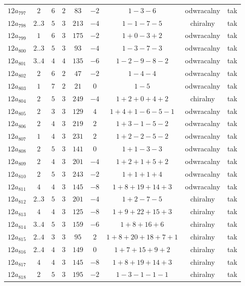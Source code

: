 \begin{longtable}{ccccccccc}
$12a_{797}$ & $2$ & $6$ & $2$ & $83$ & $-2$ & $1-3-6$ & odwracalny & tak \\
$12a_{798}$ & $2..3$ & $5$ & $3$ & $213$ & $-4$ & $1-1-7-5$ & chiralny & tak \\
$12a_{799}$ & $1$ & $6$ & $3$ & $175$ & $-2$ & $1+0-3+2$ & odwracalny & tak \\
$12a_{800}$ & $2..3$ & $5$ & $3$ & $93$ & $-4$ & $1-3-7-3$ & odwracalny & tak \\
$12a_{801}$ & $3..4$ & $4$ & $4$ & $135$ & $-6$ & $1-2-9-8-2$ & odwracalny & tak \\
$12a_{802}$ & $2$ & $6$ & $2$ & $47$ & $-2$ & $1-4-4$ & odwracalny & tak \\
$12a_{803}$ & $1$ & $7$ & $2$ & $21$ & $0$ & $1-5$ & odwracalny & tak \\
$12a_{804}$ & $2$ & $5$ & $3$ & $249$ & $-4$ & $1+2+0+4+2$ & chiralny & tak \\
$12a_{805}$ & $2$ & $3$ & $3$ & $129$ & $4$ & $1+4+1-6-5-1$ & odwracalny & tak \\
$12a_{806}$ & $2$ & $4$ & $3$ & $219$ & $2$ & $1+3-1-5-2$ & odwracalny & tak \\
$12a_{807}$ & $1$ & $4$ & $3$ & $231$ & $2$ & $1+2-2-5-2$ & odwracalny & tak \\
$12a_{808}$ & $2$ & $5$ & $3$ & $141$ & $0$ & $1+1-3-3$ & odwracalny & tak \\
$12a_{809}$ & $2$ & $4$ & $3$ & $201$ & $-4$ & $1+2+1+5+2$ & odwracalny & tak \\
$12a_{810}$ & $2$ & $5$ & $3$ & $243$ & $-2$ & $1+1+1+4$ & odwracalny & tak \\
$12a_{811}$ & $4$ & $4$ & $3$ & $145$ & $-8$ & $1+8+19+14+3$ & odwracalny & tak \\
$12a_{812}$ & $2..3$ & $5$ & $3$ & $201$ & $-4$ & $1+2-7-5$ & chiralny & tak \\
$12a_{813}$ & $4$ & $4$ & $3$ & $125$ & $-8$ & $1+9+22+15+3$ & chiralny & tak \\
$12a_{814}$ & $3..4$ & $5$ & $3$ & $159$ & $-6$ & $1+8+16+6$ & chiralny & tak \\
$12a_{815}$ & $2..4$ & $3$ & $3$ & $95$ & $2$ & $1+8+20+18+7+1$ & chiralny & tak \\
$12a_{816}$ & $2..4$ & $4$ & $3$ & $149$ & $0$ & $1+7+15+9+2$ & chiralny & tak \\
$12a_{817}$ & $4$ & $4$ & $3$ & $145$ & $-8$ & $1+8+19+14+3$ & chiralny & tak \\
$12a_{818}$ & $2$ & $5$ & $3$ & $195$ & $-2$ & $1-3-1-1-1$ & chiralny & tak \\

\end{longtable}
